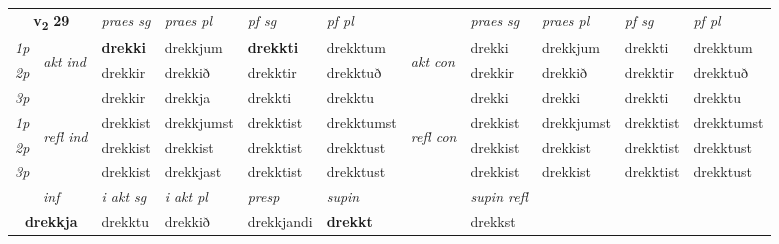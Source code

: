 \noindent
\begin{tabular}{lllllllllll} \toprule
\multicolumn{2}{c}{\textbf{v{\textsubscript{2}}} \Large{\textbf{29}}}  &  \textit{praes sg}  & \textit{praes pl}  &\textit{ pf sg} & \textit{pf pl} &  &  \textit{praes sg}  & \textit{praes pl}  & \textit{pf sg} & \textit{pf pl } \\*
	\cmidrule{3-6} \cmidrule{8-11}
 {\textit{1p}} & \multirow{3}{*}{\begin{turn}{90}\textit{akt ind}\end{turn}} & \textbf{drekki} & drekkjum & \textbf{drekkti} & drekktum & \multirow{3}{*}{\begin{turn}{90}\textit{akt con}\end{turn}} &drekki & drekkjum & drekkti & drekktum\\*
 {\textit{2p}} &  &  drekkir  & drekkið & drekktir & drekktuð & & drekkir & drekkið & drekktir & drekktuð \\*
{\textit{3p}} &  & drekkir & drekkja & drekkti & drekktu & & drekki & drekki& drekkti & drekktu \\*
\cmidrule{3-6} \cmidrule{8-11}
 {\textit{1p}} & \multirow{3}{*}{\begin{turn}{90}\textit{refl ind}\end{turn}}  & drekkist & drekkjumst & drekktist & drekktumst & \multirow{3}{*}{\begin{turn}{90}\textit{refl con}\end{turn}}  &drekkist & drekkjumst & drekktist & drekktumst \\*
 {\textit{2p}} &  & drekkist & drekkist & drekktist & drekktust & &drekkist & drekkist & drekktist & drekktust \\*
 {\textit{3p}}  & & drekkist & drekkjast & drekktist & drekktust & & drekkist & drekkist& drekktist & drekktust \\*
\cmidrule{3-6} \cmidrule{8-11}

   \multicolumn{2}{c}{\textit{inf}}  & \textit{i akt sg} & \textit{i akt pl}   & \textit{presp} & \textit{supin} && \textit{supin refl}  \\*
  \multicolumn{2}{c}{\textbf{drekkja}} & drekktu  & drekkið   & drekkjandi &  \textbf{drekkt} && drekkst  \\*
\end{tabular}

